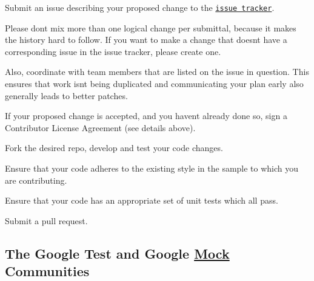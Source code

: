 \begin{DoxyEnumerate}
\item Submit an issue describing your proposed change to the \href{https://github.com/google/googletest}{\tt issue tracker}.
\end{DoxyEnumerate}
\begin{DoxyEnumerate}
\item Please don\textquotesingle{}t mix more than one logical change per submittal, because it makes the history hard to follow. If you want to make a change that doesn\textquotesingle{}t have a corresponding issue in the issue tracker, please create one.
\end{DoxyEnumerate}
\begin{DoxyEnumerate}
\item Also, coordinate with team members that are listed on the issue in question. This ensures that work isn\textquotesingle{}t being duplicated and communicating your plan early also generally leads to better patches.
\end{DoxyEnumerate}
\begin{DoxyEnumerate}
\item If your proposed change is accepted, and you haven\textquotesingle{}t already done so, sign a Contributor License Agreement (see details above).
\end{DoxyEnumerate}
\begin{DoxyEnumerate}
\item Fork the desired repo, develop and test your code changes.
\end{DoxyEnumerate}
\begin{DoxyEnumerate}
\item Ensure that your code adheres to the existing style in the sample to which you are contributing.
\end{DoxyEnumerate}
\begin{DoxyEnumerate}
\item Ensure that your code has an appropriate set of unit tests which all pass.
\end{DoxyEnumerate}
\begin{DoxyEnumerate}
\item Submit a pull request.
\end{DoxyEnumerate}

\subsection*{The Google Test and Google \hyperlink{classMock}{Mock} Communities}

